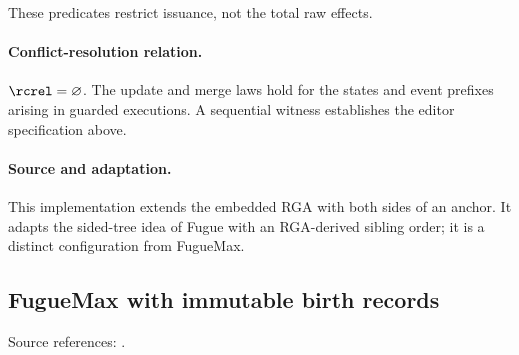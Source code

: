These predicates restrict issuance, not the total raw effects.


\paragraph{Conflict-resolution relation.}
$\rcrel=\varnothing$. The update and merge laws hold for the states and event prefixes arising in guarded executions. A sequential witness establishes the editor specification above.


\paragraph{Source and adaptation.}
This implementation extends the embedded RGA with both sides of an anchor. It adapts the sided-tree idea of Fugue with an RGA-derived sibling order; it is a distinct configuration from FugueMax.


\subsection{FugueMax with immutable birth records}
\label{app:dt-fugue-max}

\noindent Source references: \cite{FugueMax}.












